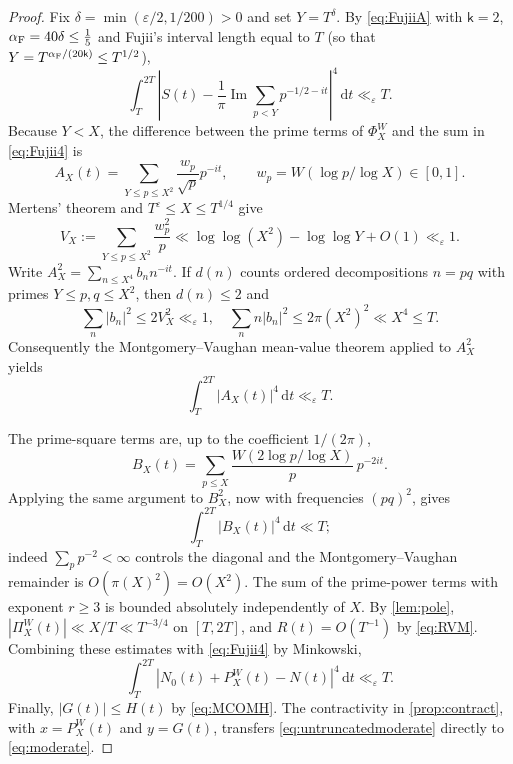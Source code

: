 \documentclass[11pt,a4paper]{article}
\numberwithin{equation}{section}
\theoremstyle{definition}
\theoremstyle{remark}
\newcommand{\dd}{\,\mathrm dt}
\begin{document}
\begin{proof}
Fix $\delta=\min(\varepsilon/2,1/200)>0$ and set $Y=T^\delta$. By \eqref{eq:FujiiA} with $\mathsf k=2$, $\alpha_{\rm F}=40\delta\le\frac15$ and Fujii's interval length equal to $T$ (so that $Y=T^{\alpha_{\rm F}/(20\mathsf k)}\le T^{1/2}$),
\begin{equation}\label{eq:Fujii4}
\int_T^{2T}\left|S(t)-\frac1\pi\operatorname{Im}\sum_{p<Y}p^{-1/2-it}\right|^4\dd\ll_\varepsilon T.
\end{equation}
Because $Y<X$, the difference between the prime terms of $\Phi_X^W$ and the sum in \eqref{eq:Fujii4} is
\begin{equation}
A_X(t)=\sum_{Y\le p\le X^2}\frac{w_p}{\sqrt p}p^{-it},
\qquad w_p=W(\log p/\log X)\in[0,1].
\end{equation}
Mertens' theorem and $T^\varepsilon\le X\le T^{1/4}$ give
\begin{equation}\label{eq:variance}
V_X:=\sum_{Y\le p\le X^2}\frac{w_p^2}p
\ll\log\log(X^2)-\log\log Y+O(1)\ll_\varepsilon1.
\end{equation}
Write $A_X^2=\sum_{n\le X^4}b_n n^{-it}$. If $d(n)$ counts ordered decompositions $n=pq$ with primes $Y\le p,q\le X^2$, then $d(n)\le2$ and
\begin{equation}
\sum_n|b_n|^2\le2V_X^2\ll_\varepsilon1,
\quad
\sum_n n|b_n|^2\le2\pi(X^2)^2\ll X^4\le T.
\end{equation}
Consequently the Montgomery--Vaughan mean-value theorem applied to $A_X^2$ yields
\begin{equation}\label{eq:A4}
\int_T^{2T}|A_X(t)|^4\dd\ll_\varepsilon T.
\end{equation}

The prime-square terms are, up to the coefficient $1/(2\pi)$,
\begin{equation}
B_X(t)=\sum_{p\le X}\frac{W(2\log p/\log X)}p\,p^{-2it}.
\end{equation}
Applying the same argument to $B_X^2$, now with frequencies $(pq)^2$, gives
\begin{equation}\label{eq:B4}
\int_T^{2T}|B_X(t)|^4\dd\ll T;
\end{equation}
indeed $\sum_p p^{-2}<\infty$ controls the diagonal and the Montgomery--Vaughan remainder is $O(\pi(X)^2)=O(X^2)$. The sum of the prime-power terms with exponent $r\ge3$ is bounded absolutely independently of $X$. By \cref{lem:pole}, $|\Pi_X^W(t)|\ll X/T\ll T^{-3/4}$ on $[T,2T]$, and $R(t)=O(T^{-1})$ by \eqref{eq:RVM}. Combining these estimates with \eqref{eq:Fujii4} by Minkowski,
\begin{equation}\label{eq:untruncatedmoderate}
\int_T^{2T}|N_0(t)+P_X^W(t)-N(t)|^4\dd\ll_\varepsilon T.
\end{equation}
Finally, $|G(t)|\le H(t)$ by \eqref{eq:MCOMH}. The contractivity in \cref{prop:contract}, with $x=P_X^W(t)$ and $y=G(t)$, transfers \eqref{eq:untruncatedmoderate} directly to \eqref{eq:moderate}.
\end{proof}
\end{document}
